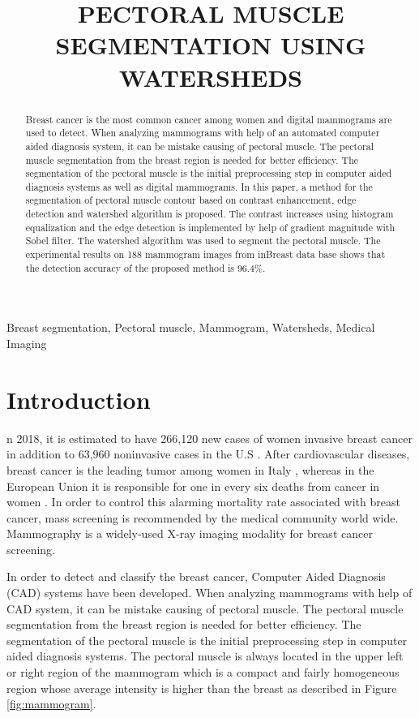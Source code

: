\documentclass{article}
\title{PECTORAL MUSCLE SEGMENTATION USING WATERSHEDS}
\begin{document}
%
\maketitle
%
\begin{abstract}
Breast cancer is the most common cancer among women and digital mammograms are used to detect. When analyzing mammograms with help of an automated computer aided diagnosis system, it can be mistake causing of pectoral muscle. The pectoral muscle segmentation from the breast region is needed for better efficiency. The segmentation of the pectoral muscle is the initial preprocessing step in computer aided diagnosis systems as well as digital mammograms. In this paper, a method for the segmentation of pectoral muscle contour based on contrast enhancement, edge detection and watershed algorithm is proposed. The contrast increases using histogram equalization and the edge detection is implemented by help of gradient magnitude with Sobel filter. The watershed algorithm was used to segment the pectoral muscle. The experimental results on 188 mammogram images from inBreast data base shows that the detection accuracy of the proposed method is 96.4\%.

\end{abstract}
%
\begin{keywords}
Breast segmentation, Pectoral muscle, Mammogram, Watersheds, Medical Imaging
\end{keywords}
%
\section{Introduction}
\label{sec:intro}
\lettrine[findent=2pt]
{}{}n 2018, it is estimated to have 266,120 new cases of women invasive breast cancer in addition to 63,960 noninvasive cases in the U.S \cite{2}. After cardiovascular diseases, breast cancer is the leading tumor among women in Italy \cite{1}, whereas in the European Union it is responsible for one in every six deaths from cancer in women \cite{3}. In order to control this alarming mortality rate associated with breast cancer, mass screening is recommended by the medical community world wide. Mammography is a widely-used X-ray imaging modality for breast cancer screening. 

In order to detect and classify the breast cancer, Computer Aided Diagnosis (CAD) systems have been developed. When analyzing mammograms with help of CAD system, it can be mistake causing of pectoral muscle. The pectoral muscle segmentation from the breast region is needed for better efficiency. The segmentation of the pectoral muscle is the initial preprocessing step in computer aided diagnosis systems. The pectoral muscle is always located in the upper left or right region of the mammogram which is a compact and fairly homogeneous region whose average intensity is higher than the breast as described in Figure \ref{fig:mammogram}.
\end{document}
